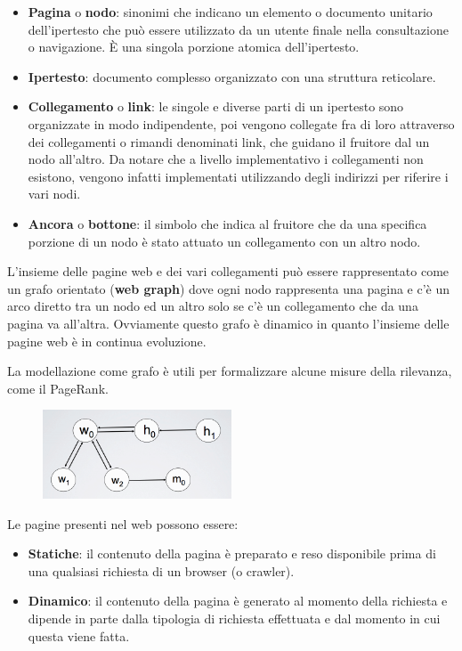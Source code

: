 \begin{itemize}
	\item \textbf{Pagina} o \textbf{nodo}: sinonimi che indicano un elemento o documento unitario dell'ipertesto che può essere utilizzato da un utente finale nella consultazione o navigazione. \`E una singola porzione atomica dell'ipertesto.
	\item \textbf{Ipertesto}: documento complesso organizzato con una struttura reticolare.
	\item \textbf{Collegamento} o \textbf{link}: le singole e diverse parti di un ipertesto sono organizzate in modo indipendente, poi vengono collegate fra di loro attraverso dei collegamenti o rimandi denominati link, che guidano il fruitore dal un nodo all'altro. Da notare che a livello implementativo i collegamenti non esistono, vengono infatti implementati utilizzando degli indirizzi per riferire i vari nodi.
	\item \textbf{Ancora} o \textbf{bottone}: il simbolo che indica al fruitore che da una specifica porzione di un nodo è stato attuato un collegamento con un altro nodo.
\end{itemize}

L'insieme delle pagine web e dei vari collegamenti può essere rappresentato come un grafo orientato (\textbf{web graph}) dove ogni nodo rappresenta una pagina e c'è un arco diretto tra un nodo ed un altro solo se c'è un collegamento che da una pagina va all'altra.
Ovviamente questo grafo è dinamico in quanto l'insieme delle pagine web è in continua evoluzione.

La modellazione come grafo è utili per formalizzare alcune misure della rilevanza, come il PageRank.

\begin{figure}[htbp]
	\centering
	\includegraphics[width = 0.5\textwidth]{images/l17-fig-3}
\end{figure}

Le pagine presenti nel web possono essere:

\begin{itemize}
	\item \textbf{Statiche}: il contenuto della pagina è preparato e reso disponibile prima di una qualsiasi richiesta di un browser (o crawler).
	\item \textbf{Dinamico}: il contenuto della pagina è generato al momento della richiesta e dipende in parte dalla tipologia di richiesta effettuata e dal momento in cui questa viene fatta.
\end{itemize}


